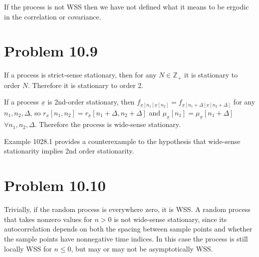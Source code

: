 \documentclass{article}
\begin{document}
If the process is not WSS then we have not defined what it means to be 
ergodic in the correlation or covariance.

\section*{Problem 10.9}
If a process is strict-sense stationary, then for any $N \in \mathbb{Z}_+$
it is stationary to order $N$. Therefore it is stationary to order 2.

If a process $\underline{x}$ is 2nd-order stationary, then 
$  f_{\underline{x}[n_1]\underline{x}[n_2]} 
 = f_{\underline{x}[n_1+\Delta]\underline{x}[n_2+\Delta]}$
for any $n_1, n_2, \Delta$, so 
$r_{\underline{x}}[n_1,n_2] = r_{\underline{x}}[n_1 + \Delta, n_2 + \Delta]$
and $\mu_{\underline{x}}[n_1] = \mu_{\underline{x}}[n_1 + \Delta]$ 
$\forall n_1, n_2, \Delta$. Therefore the process is wide-sense stationary.

Example 1028.1 provides a counterexample to the hypothesis that wide-sense
stationarity implies 2nd order stationarity.



\section*{Problem 10.10}
Trivially, if the random process is everywhere zero, it is WSS. A random
process that takes nonzero values for $n > 0$ is not wide-sense 
stationary, since its autocorrelation depends on both the spacing between
sample points and whether the sample points have nonnegative time indices.
In this case the process is still locally WSS for $n \leq 0$, but may or
may not be asymptotically WSS.
\end{document}

